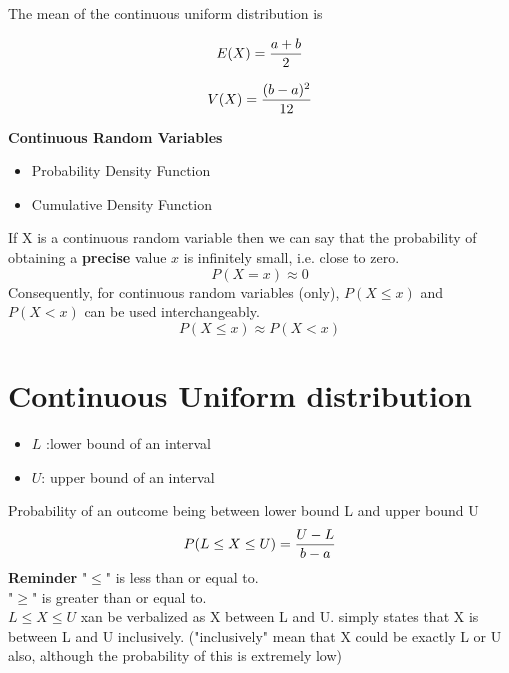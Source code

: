 
{
	
	The mean of the continuous uniform distribution is
	
	\[ E(X) = {a+b \over 2}\]
	
	\[ V(X) = {(b-a)^2\over12}\]
}


{
\textbf{Continuous Random Variables}
\begin{itemize}
\item Probability Density Function
\item Cumulative Density Function
\end{itemize}
If X is a continuous random variable then we can say that the probability of obtaining a \textbf{precise} value $x$ is infinitely small, i.e. close to zero.
\[P(X=x) \approx 0 \]
Consequently, for continuous random variables (only), $P(X \leq x)$ and $P(X < x)$ can be used interchangeably.
\[P(X \leq x) \approx P(X < x) \]
}
\section{Continuous Uniform distribution}
{
\begin{itemize}
\item $L$ :lower bound of an interval \item $U$: upper bound of an
interval
\end{itemize}
Probability of an outcome being between lower bound L and upper
bound U \[P( L \leq X \leq U) = { U - L \over b - a }\]
\textbf{Reminder}
"$\leq$" is less than or equal to.\\
"$\geq$" is greater than or equal to.\\
$L \leq X \leq U$ xan be verbalized as X between L and U. simply
states that X is between L and U inclusively.
("inclusively" mean that X could be exactly L or U also, although
the probability of this is extremely low)\\
}


